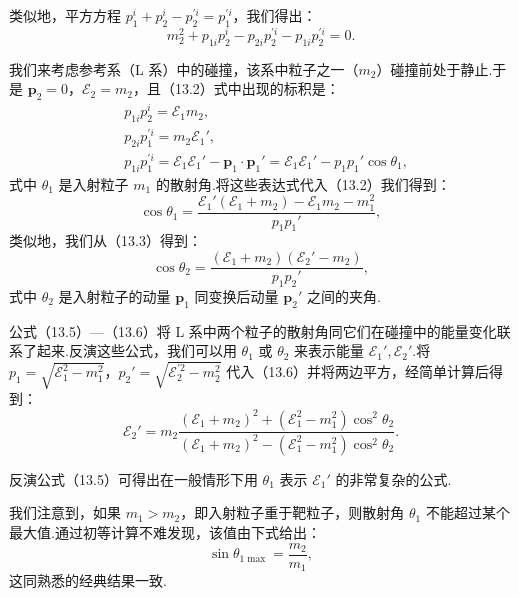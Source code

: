 类似地，平方方程 $p_1^i+p_2^i-p_2^{\prime i}=p_1^{\prime i}$，我们得出：
\begin{equation}
  m_2^2+p_{1i}p_2^i-p_{2i}p_2^{\prime i}-p_{1i}p_2^{\prime i}=0.
\end{equation}

我们来考虑参考系（L 系）中的碰撞，该系中粒子之一（$m_2$）碰撞前处于静止.于是 $\boldsymbol{p}_2=0$，$\mathcal{E}_2=m_2$，且（13.2）式中出现的标积是：
\begin{equation}
\begin{aligned}
  &p_{1i}p_2^i=\mathcal{E}_1m_2,\\
  &p_{2i}p_1^{\prime i}=m_2\mathcal{E}_1',\\
  &p_{1i}p_1^{\prime i}
  =\mathcal{E}_1\mathcal{E}_1'-\boldsymbol{p}_1\cdot\boldsymbol{p}_1'
  =\mathcal{E}_1\mathcal{E}_1'-p_1p_1'\cos\theta_1,
\end{aligned}
\end{equation}
式中 $\theta_1$ 是入射粒子 $m_1$ 的散射角.将这些表达式代入（13.2）我们得到：
\begin{equation}
  \cos\theta_1=\frac{\mathcal{E}_1'(\mathcal{E}_1+m_2)
  -\mathcal{E}_1m_2-m_1^2}{p_1p_1'},
\end{equation}
类似地，我们从（13.3）得到：
\begin{equation}
  \cos\theta_2=\frac{(\mathcal{E}_1+m_2)(\mathcal{E}_2'-m_2)}{p_1p_2'},
\end{equation}
式中 $\theta_2$ 是入射粒子的动量 $\boldsymbol{p}_1$ 同变换后动量 $\boldsymbol{p}_2'$ 之间的夹角.

公式（13.5）—（13.6）将 L 系中两个粒子的散射角同它们在碰撞中的能量变化联系了起来.反演这些公式，我们可以用 $\theta_1$ 或 $\theta_2$ 来表示能量 $\mathcal{E}_1',\mathcal{E}_2'$.将 $p_1=\sqrt{\mathcal{E}_1^2-m_1^2}$，$p_2'=\sqrt{\mathcal{E}_2^{\prime 2}-m_2^2}$ 代入（13.6）并将两边平方，经简单计算后得到：
\begin{equation}
  \mathcal{E}_2'=m_2
  \frac{(\mathcal{E}_1+m_2)^2+(\mathcal{E}_1^2-m_1^2)\cos^2\theta_2}
  {(\mathcal{E}_1+m_2)^2-(\mathcal{E}_1^2-m_1^2)\cos^2\theta_2}.
\end{equation}

反演公式（13.5）可得出在一般情形下用 $\theta_1$ 表示 $\mathcal{E}_1'$ 的非常复杂的公式.

我们注意到，如果 $m_1>m_2$，即入射粒子重于靶粒子，则散射角 $\theta_1$ 不能超过某个最大值.通过初等计算不难发现，该值由下式给出：
\begin{equation}
  \sin\theta_{1\max}=\frac{m_2}{m_1},
\end{equation}
这同熟悉的经典结果一致.

